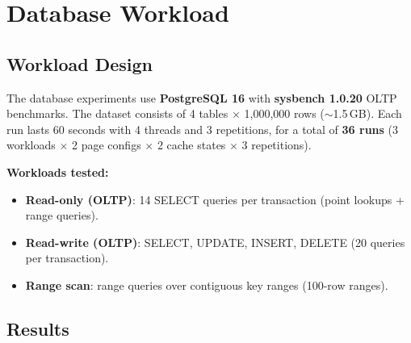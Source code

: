 \documentclass[conference]{IEEEtran}
\begin{document}
\section{Database Workload}

\subsection{Workload Design}

The database experiments use \textbf{PostgreSQL 16} with \textbf{sysbench 1.0.20} OLTP benchmarks. The dataset consists of 4 tables $\times$ 1,000,000 rows ($\sim$1.5\,GB). Each run lasts 60 seconds with 4 threads and 3 repetitions, for a total of \textbf{36 runs} (3 workloads $\times$ 2 page configs $\times$ 2 cache states $\times$ 3 repetitions).

\textbf{Workloads tested:}
\begin{itemize}
    \item \textbf{Read-only (OLTP)}: 14 SELECT queries per transaction (point lookups + range queries).
    \item \textbf{Read-write (OLTP)}: SELECT, UPDATE, INSERT, DELETE (20 queries per transaction).
    \item \textbf{Range scan}: range queries over contiguous key ranges (100-row ranges).
\end{itemize}

\subsection{Results}
\end{document}
